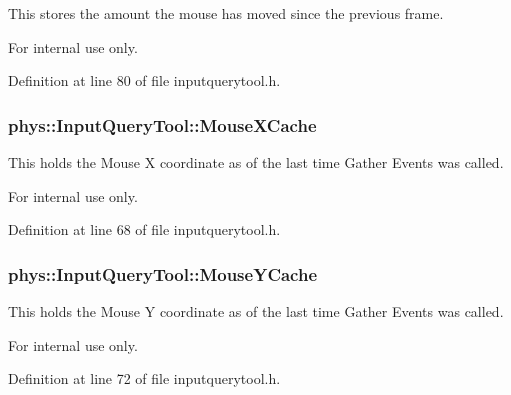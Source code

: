 This stores the amount the mouse has moved since the previous frame. 

\begin{DoxyInternal}{For internal use only.}
\end{DoxyInternal}


Definition at line 80 of file inputquerytool.h.

\hypertarget{classphys_1_1InputQueryTool_a857f0b9ad8bb720f1daf57c9eda6e0fb}{
\subsubsection[{MouseXCache}]{ {\bf phys::InputQueryTool::MouseXCache}}}
\label{da/d96/classphys_1_1InputQueryTool_a857f0b9ad8bb720f1daf57c9eda6e0fb}


This holds the Mouse X coordinate as of the last time Gather Events was called. 

\begin{DoxyInternal}{For internal use only.}
\end{DoxyInternal}


Definition at line 68 of file inputquerytool.h.

\hypertarget{classphys_1_1InputQueryTool_a9378af076545f92b70d853776cc6065c}{
\subsubsection[{MouseYCache}]{ {\bf phys::InputQueryTool::MouseYCache}}}
\label{da/d96/classphys_1_1InputQueryTool_a9378af076545f92b70d853776cc6065c}


This holds the Mouse Y coordinate as of the last time Gather Events was called. 

\begin{DoxyInternal}{For internal use only.}
\end{DoxyInternal}


Definition at line 72 of file inputquerytool.h.


